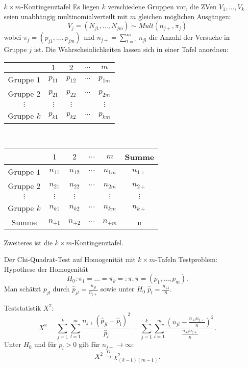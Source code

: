 \begin{karte}{\(k\times m\)-Kontingenztafel}
Es liegen \(k\) verschiedene Gruppen vor, die ZVen \(V_1, \ldots, V_k\) seien unabhängig multinomialverteilt 
mit \(m\) gleichen möglichen Ausgängen: 
\[ V_j = (N_{j1}, \ldots, N_{jm}) \sim Mult(n_{j+}, \pi_j) \]
wobei \(\pi_j = (p_{j1}, \ldots, p_{jm})\) und \(n_{j+} = \sum_{l=1}^m n_{jl}\) die Anzahl der Versuche in Gruppe \(j\) ist.
Die Wahrscheinlichkeiten lassen sich in einer Tafel anordnen: \\
\begin{tabular}{c|cccc}
    & \(1\) & \(2\) & \(\ldots\) & \(m\) \\
    \hline
    Gruppe \(1\) & \(p_{11}\) & \(p_{12}\) & \(\cdots\) & \(p_{1m}\) \\
    Gruppe \(2\) & \(p_{21}\) & \(p_{22}\) & \(\cdots\) & \(p_{2m}\) \\
    \(\vdots\) & \(\vdots\) & \(\vdots\) & & \(\vdots\) \\
    Gruppe \(k\) & \(p_{k1}\) & \(p_{k2}\) & \(\cdots\) & \(p_{km}\)
\end{tabular} \ \begin{tabular}{c|cccc|c}
    & \(1\) & \(2\) & \(\ldots\) & \(m\) & Summe \\
    \hline
    Gruppe \(1\) & \(n_{11}\) & \(n_{12}\) & \(\cdots\) & \(n_{1m}\) & \(n_{1+}\)\\
    Gruppe \(2\) & \(n_{21}\) & \(n_{22}\) & \(\cdots\) & \(n_{2m}\) & \(n_{2+}\) \\
    \(\vdots\) & \(\vdots\) & \(\vdots\) & & \(\vdots\) & \(\vdots\) \\
    Gruppe \(k\) & \(n_{k1}\) & \(n_{k2}\) & \(\cdots\) & \(n_{km}\) & \(n_{k+}\) \\
    \hline
    Summe & \(n_{+1}\) & \(n_{+2}\) & \(\cdots\) & \(n_{+m}\) & n
\end{tabular}

Zweiteres ist die \(k\times m\)-Kontingenztafel.
\end{karte}

\begin{karte}{Der Chi-Quadrat-Test auf Homogenität mit \(k\times m\)-Tafeln}
    Testproblem: Hypothese der Homogenität
    \[ H_0: \pi_1 = \ldots = \pi_k =: \pi, \pi = (p_1, \ldots, p_m). \]
    Man schätzt \(p_{jl}\) durch \(\hat{p}_{jl} = \frac{n_{jl}}{n_{j+}}\) sowie unter \(H_0\) 
    \(\hat{p}_l = \frac{n_{+l}}{n}\).

    Teststatistik \(X^2\):
    \[ X^2 = \sum_{j=1}^k \sum_{l=1}^m \frac{n_{j+} (\hat{p}_{jl} - \hat{p}_l)^2}{\hat{p}_l} = \sum_{j=1}^k \sum_{l=1}^m \frac{ (n_{jl} - \frac{n_{+l} n_{j+}}{n})^2 }{ \frac{ n_{+l} n_{j+} }{n} }. \]
    Unter \(H_0\) und für \(p_l > 0\) gilt für \(n_{j+} \rightarrow \infty\): 
    \[ X^2 \overset{D}{\rightarrow} \chi_{(k-1)(m-1)}^2. \]
\end{karte}